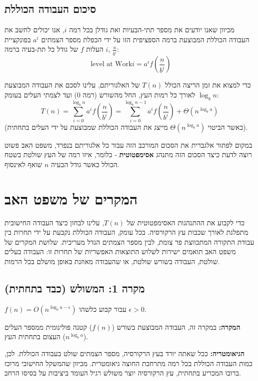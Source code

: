 \documentclass[11pt, a4paper]{article}
\begin{document}
\subsection*{סיכום העבודה הכוללת} 
מכיוון שאנו יודעים את מספר תתי-הבעיות ואת גודלן בכל רמה $i$, אנו יכולים לחשב את העבודה הכוללת המבוצעת ברמה הספציפית הזו על ידי הכפלת מספר הצמתים $a^i$ בפונקציית העלות $f$ של גודל כל תת-בעיה ברמה $i$, $\frac{n}{b^i}$:
\[
    \text{ level at Work} i = a^i f\left(\frac{n}{b^i}\right)
\]

כדי למצוא את זמן הריצה הכולל $T(n)$ של האלגוריתם, עלינו לסכם את העבודה המבוצעת לאורך כל רמות העץ, החל מהשורש (רמה 0) ועד לצמתי העלים בעומק $\log_b n$:
\begin{equation*}
    T(n) = \sum_{i=0}^{\log_b n} a^i f\left(\frac{n}{b^i}\right) = \sum_{i=0}^{\log_b n - 1} a^i f\left(\frac{n}{b^i}\right) + \Theta(n^{\log_b a})
\end{equation*}
(כאשר הביטוי $\Theta(n^{\log_b a})$ מייצג את העבודה הכוללת שמבוצעת על ידי העלים בתחתית).

במקום לפתור אלגברית את הסכום המורכב הזה עבור כל אלגוריתם בנפרד, משפט האב פשוט רוצה לדעת כיצד הסכום הזה מתנהג \textbf{אסימפטוטית} - כלומר, איזו רמה של העץ שולטת בשטח הכולל כאשר גודל הבעיה $n$ שואף לאינסוף.
\newpage
\section*{המקרים של משפט האב}
כדי לקבוע את ההתנהגות האסימפטוטית של $T(n)$, עלינו לבחון כיצד העבודה החישובית מתפלגת לאורך שכבות עץ הרקורסיה. בכל עומק, העבודה הכוללת נקבעת על ידי תחרות בין עבודת התקורה המתכווצת פר צומת, לבין מספר הצמתים הגדל מעריכית. שלושת המקרים של משפט האב תואמים ישירות לשלוש התוצאות האפשריות של תחרות זו: העבודה בעלים שולטת, העבודה בשורש שולטת, או שהעבודה מאוזנת באופן מושלם בכל הרמות.
\vspace{0.5cm}
\subsection*{מקרה 1: המשולש (כבד בתחתית)}

\begin{tcolorbox}[colback=accent1!10, colframe=accent1, title=\textbf{התנאי}]
$f(n) = O(n^{\log_b a - \epsilon})$ עבור קבוע כלשהו $\epsilon > 0$.
\end{tcolorbox}
\textbf{המקרה:} במקרה זה, העבודה המבוצעת בשורש ($f(n)$) קטנה פולינומית ממספר העלים העצום בתחתית העץ ($n^{\log_b a}$).

\textbf{הגיאומטריה:} ככל שאתה יורד בעץ הרקורסיה, מספר הצמתים שולט בעבודה הכוללת. לכן, כמות העבודה הכוללת בכל רמה מתרחבת החוצה גיאומטרית. מכיוון שהמשקל החישובי מרוכז ברובו המכריע בתחתית, עץ הרקורסיה יוצר משולש רגיל העומד ביציבות על בסיסו הרחב.
\end{document}
